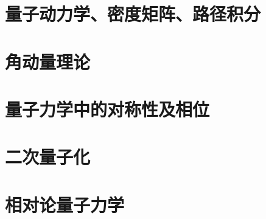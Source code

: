 \documentclass[UTF8]{ctexbook}
\begin{document}






\chapter{量子动力学、密度矩阵、路径积分}
\chapter{角动量理论}
\chapter{量子力学中的对称性及相位}
\chapter{二次量子化}
\chapter{相对论量子力学}
\end{document}
